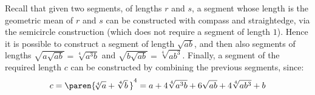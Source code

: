 Recall that given two segments, of lengths $r$ and $s$,
a segment whose length is the geometric mean of $r$ and $s$
can be constructed with compass and straightedge,
via the semicircle construction
(which does not require a segment of length $1$). \newline
Hence it is possible to construct a segment of length $\sqrt{a b}$,
and then also segments of lengths
$\sqrt{a \sqrt{a b}} = \sqrt[4]{a^3 b}$
and $\sqrt{b \sqrt{a b}} = \sqrt[4]{a b^3}$.
Finally, a segment of the required length $c$ can be constructed
by combining the previous segments, since:
\begin{equation*}
 c = \paren{\! \sqrt[4]{a} + \sqrt[4]{b} \,}^4
   = a + 4 \sqrt[4]{a^3 b} + 6 \sqrt{a b} + 4 \sqrt[4]{a b^3} + b
\end{equation*}
